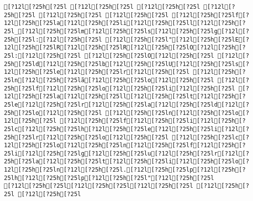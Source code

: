 \documentclass{scrartcl}
\begin{document}
\begin{Verbatim}
[?12l[?25h[?25l [?12l[?25h[?25l [?12l[?25h[?25l [?12l[?25h[?25l [?12l[?25h[?25l [?12l[?25h[?25l [?12l[?25h[?25lf[?12l[?25h[?25la[?12l[?25h[?25li[?12l[?25h[?25ll[?12l[?25h[?25l_[?12l[?25h[?25lm[?12l[?25h[?25ls[?12l[?25h[?25lg[?12l[?25h[?25l:[?12l[?25h[?25l [?12l[?25h[?25l"[?12l[?25h[?25lE[?12l[?25h[?25lR[?12l[?25h[?25lR[?12l[?25h[?25lO[?12l[?25h[?25l:[?12l[?25h[?25l [?12l[?25h[?25lO[?12l[?25h[?25l [?12l[?25h[?25ld[?12l[?25h[?25lb[?12l[?25h[?25lU[?12l[?25h[?25ls[?12l[?25h[?25le[?12l[?25h[?25lr[?12l[?25h[?25l [?12l[?25h[?25ln[?12l[?25h[?25lã[?12l[?25h[?25lo[?12l[?25h[?25l [?12l[?25h[?25lf[?12l[?25h[?25lo[?12l[?25h[?25li[?12l[?25h[?25l [?12l[?25h[?25la[?12l[?25h[?25ll[?12l[?25h[?25lt[?12l[?25h[?25le[?12l[?25h[?25lr[?12l[?25h[?25la[?12l[?25h[?25ld[?12l[?25h[?25lo[?12l[?25h[?25l [?12l[?25h[?25ln[?12l[?25h[?25lo[?12l[?25h[?25l [?12l[?25h[?25lf[?12l[?25h[?25li[?12l[?25h[?25lc[?12l[?25h[?25lh[?12l[?25h[?25le[?12l[?25h[?25li[?12l[?25h[?25lr[?12l[?25h[?25lo[?12l[?25h[?25l [?12l[?25h[?25lc[?12l[?25h[?25lo[?12l[?25h[?25ln[?12l[?25h[?25lf[?12l[?25h[?25li[?12l[?25h[?25lg[?12l[?25h[?25lu[?12l[?25h[?25lr[?12l[?25h[?25la[?12l[?25h[?25lt[?12l[?25h[?25li[?12l[?25h[?25lo[?12l[?25h[?25ln[?12l[?25h[?25l.[?12l[?25h[?25lp[?12l[?25h[?25lh[?12l[?25h[?25lp[?12l[?25h[?25l"[?12l[?25h[?25l
[?12l[?25h[?25l[?12l[?25h[?25l[?12l[?25h[?25l [?12l[?25h[?25l [?12l[?25h[?25l

\end{Verbatim}
\end{document}
